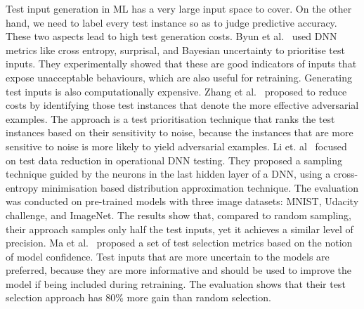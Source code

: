 \label{sec:testprioritisation}
Test input generation in ML has a very large input space to cover.
On the other hand, we need to label every test instance so as to judge predictive accuracy. 
These two aspects lead to high test generation costs.
Byun et al.~ used DNN metrics like cross entropy, surprisal, and Bayesian uncertainty to prioritise test inputs.
They experimentally showed that these are good indicators of inputs that expose unacceptable behaviours, which are also useful for retraining.
Generating test inputs is also computationally expensive.
Zhang et al.~ proposed to reduce costs by identifying those test instances that denote the more effective adversarial examples.
The approach is a test prioritisation technique that ranks the test instances based on their sensitivity to noise, because the instances that are more sensitive to noise is more likely to yield adversarial examples.
Li et. al~ focused on test data reduction in operational DNN testing.
They proposed a sampling technique guided by the neurons in the last hidden layer of a DNN, using a cross-entropy minimisation based distribution approximation technique.
The evaluation was conducted on pre-trained models with three image datasets: MNIST, Udacity challenge, and ImageNet. 
The results show that, compared to random sampling, their approach samples only half the test inputs, yet it achieves a similar level of precision.
Ma et al.~ proposed a set of test selection metrics based on the notion of model confidence.
Test inputs that are more uncertain to the models are preferred, because they are more informative and should be used to improve the model if being included during retraining.
The evaluation shows that their test selection approach has 80\% more gain than random selection.

